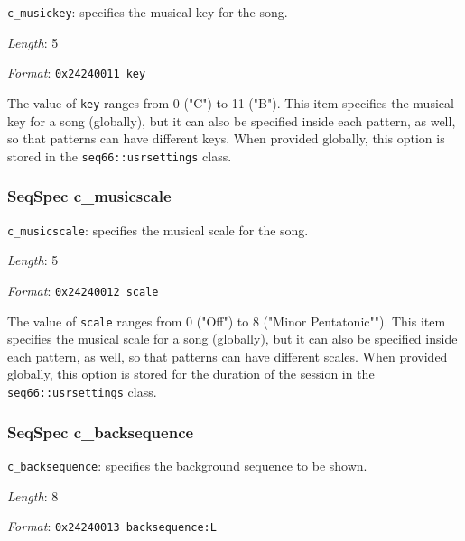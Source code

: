    \begin{description}
      \item \texttt{c\_musickey}: specifies the musical key for the song.
      \item \textsl{Length}: 5
      \item \textsl{Format}: \texttt{0x24240011 key}
   \end{description}

   The value of \texttt{key} ranges from 0 ("C") to 11 ("B").
   This item specifies the musical key for a song (globally), but it
   can also be specified inside each pattern, as well, so that patterns
   can have different keys.
   When provided globally, this option is stored in the
   \texttt{seq66::usrsettings} class.

\subsubsection{SeqSpec c\_musicscale}
\label{subsubsec:midi_format_track_seqspec_musicscale}

   \begin{description}
      \item \texttt{c\_musicscale}: specifies the musical scale for the song.
      \item \textsl{Length}: 5
      \item \textsl{Format}: \texttt{0x24240012 scale}
   \end{description}

   The value of \texttt{scale} ranges from 0 ("Off") to 8 ("Minor Pentatonic"").
   This item specifies the musical scale for a song (globally), but it
   can also be specified inside each pattern, as well, so that patterns
   can have different scales.
   When provided globally, this option is stored for the duration
   of the session in the
   \texttt{seq66::usrsettings} class.

\subsubsection{SeqSpec c\_backsequence}
\label{subsubsec:midi_format_track_seqspec_backsequence}

   \begin{description}
      \item \texttt{c\_backsequence}:
         specifies the background sequence to be shown.
      \item \textsl{Length}: 8
      \item \textsl{Format}: \texttt{0x24240013 backsequence:L}
   \end{description}

